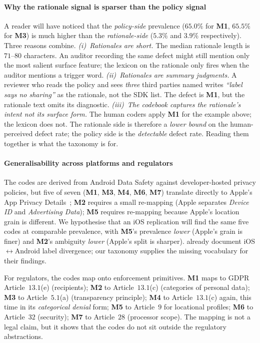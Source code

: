 \documentclass[11pt,a4paper]{article}
\newcommand{\code}[1]{\textsf{\textbf{#1}}}
\begin{document}
\paragraph{Why the rationale signal is sparser than the policy signal}
A reader will have noticed that the \emph{policy-side} prevalence
($65.0\%$ for \code{M1}, $65.5\%$ for \code{M3}) is much higher than
the \emph{rationale-side} ($5.3\%$ and $3.9\%$ respectively). Three
reasons combine. \emph{(i)~Rationales are short.} The median rationale
length is $71$--$80$ characters. An auditor recording the same defect
might still mention only the most salient surface feature; the
lexicon on the rationale only fires when the auditor mentions a
trigger word. \emph{(ii)~Rationales are summary judgments.} A reviewer
who reads the policy and sees \emph{three} third parties named writes
\emph{``label says no sharing''} as the rationale, not the SDK list.
The defect is \code{M1}, but the rationale text omits its
diagnostic. \emph{(iii)~The codebook captures the rationale's
\emph{intent} not its surface form.} The human coders apply
\code{M1} for the example above; the lexicon does not. The rationale
side is therefore a \emph{lower bound} on the human-perceived
defect rate; the policy side is the \emph{detectable} defect rate.
Reading them together is what the taxonomy is for.

\paragraph{Generalisability across platforms and regulators}
The codes are derived from Android Data Safety against developer-hosted
privacy policies, but five of seven (\code{M1}, \code{M3}, \code{M4},
\code{M6}, \code{M7}) translate directly to Apple's App Privacy
Details~\citep{appleprivacylabels2020}; \code{M2} requires a small
re-mapping (Apple separates \emph{Device ID} and \emph{Advertising
Data}); \code{M5} requires re-mapping because Apple's location grain
is different. We hypothesise that an iOS replication will find the
same five codes at comparable prevalence, with \code{M5}'s prevalence
\emph{lower} (Apple's grain is finer) and \code{M2}'s ambiguity
\emph{lower} (Apple's split is sharper). \citet{khandelwal2023comparing}
already document iOS$\leftrightarrow$Android label divergence; our
taxonomy supplies the missing vocabulary for their findings.

For regulators, the codes map onto enforcement primitives.
\code{M1} maps to GDPR Article~$13.1$(e) (recipients);
\code{M2} to Article~$13.1$(c) (categories of personal data);
\code{M3} to Article~$5.1$(a) (transparency principle);
\code{M4} to Article~$13.1$(c) again, this time in its
\emph{categorical denial} form;
\code{M5} to Article~$9$ for locational profiles;
\code{M6} to Article~$32$ (security);
\code{M7} to Article~$28$ (processor scope).
The mapping is not a legal claim, but it shows that the codes do not
sit outside the regulatory abstractions.
\end{document}
